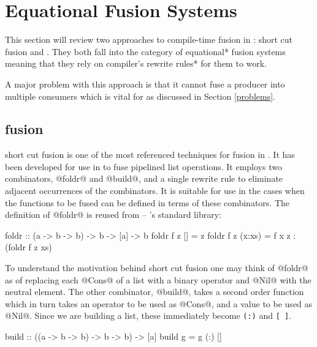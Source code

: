 \documentclass[preamble.tex]{subfiles}
\begin{document}
\chapter{Equational Fusion Systems}
\label{sec:Equational-Fusion-Systems}
\ieqfusion{}

This section will review two approaches to compile-time fusion in \Haskell:  short cut fusion and . They both fall into the category of \*equational* fusion systems meaning that they rely on compiler's \*rewrite rules* for them to work.

A major problem with this approach is that it cannot fuse a producer into multiple consumers which is vital for  as discussed in Section \ref{problems}.


\clearpage

\section{ fusion}
\label{sec:foldr-build}

 short cut fusion \cite{GLP93} is one of the most referenced techniques for fusion in \Haskell. It has been developed for use in \GHC to fuse pipelined list operations. It employs two combinators, @foldr@ and @build@, and a single rewrite rule to eliminate adjacent occurrences of the combinators. It is suitable for use in the cases when the functions to be fused can be defined in terms of these combinators. The definition of @foldr@ is reused from  -- \Haskell's standard library:

\begin{hscode}
foldr :: (a -> b -> b) -> b -> [a] -> b
foldr f z []     = z
foldr f z (x:xs) = f x z : (foldr f z xs)
\end{hscode}


To understand the motivation behind short cut fusion one may think of @foldr@ as of replacing each @Cons@ of a list with a binary operator and @Nil@ with the neutral element. The other combinator, @build@, takes a second order function which in turn takes an operator to be used as @Cons@, and a value to be used as @Nil@. Since we are building a list, these immediately become \texttt{(:)} and \texttt{{[} {]}}.

\begin{hscode}
build :: ((a -> b -> b) -> b -> b) -> [a]
build g = g (:) []
\end{hscode}
\end{document}
